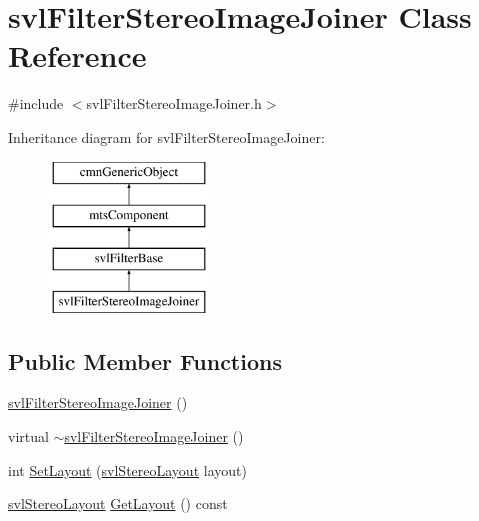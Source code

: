 \hypertarget{classsvl_filter_stereo_image_joiner}{}\section{svl\+Filter\+Stereo\+Image\+Joiner Class Reference}
\label{classsvl_filter_stereo_image_joiner}


{\ttfamily \#include $<$svl\+Filter\+Stereo\+Image\+Joiner.\+h$>$}

Inheritance diagram for svl\+Filter\+Stereo\+Image\+Joiner\+:\begin{figure}[H]
\begin{center}
\leavevmode
\includegraphics[height=4.000000cm]{d0/d20/classsvl_filter_stereo_image_joiner}
\end{center}
\end{figure}
\subsection*{Public Member Functions}
\begin{DoxyCompactItemize}
\item 
\hyperlink{classsvl_filter_stereo_image_joiner_adfbcbdb5c5e39970f8782a53ed344925}{svl\+Filter\+Stereo\+Image\+Joiner} ()
\item 
virtual \hyperlink{classsvl_filter_stereo_image_joiner_aba3e2b20a2da5d7dfd68bea5e3c3ebe8}{$\sim$svl\+Filter\+Stereo\+Image\+Joiner} ()
\item 
int \hyperlink{classsvl_filter_stereo_image_joiner_a827f760bd99de6c243a61aa198ce63d7}{Set\+Layout} (\hyperlink{svl_definitions_8h_aa90f34342a069f42a847f43f2abb812f}{svl\+Stereo\+Layout} layout)
\item 
\hyperlink{svl_definitions_8h_aa90f34342a069f42a847f43f2abb812f}{svl\+Stereo\+Layout} \hyperlink{classsvl_filter_stereo_image_joiner_a80a8c30feab0beef2ef47f86a8c9b50c}{Get\+Layout} () const 
\end{DoxyCompactItemize}
